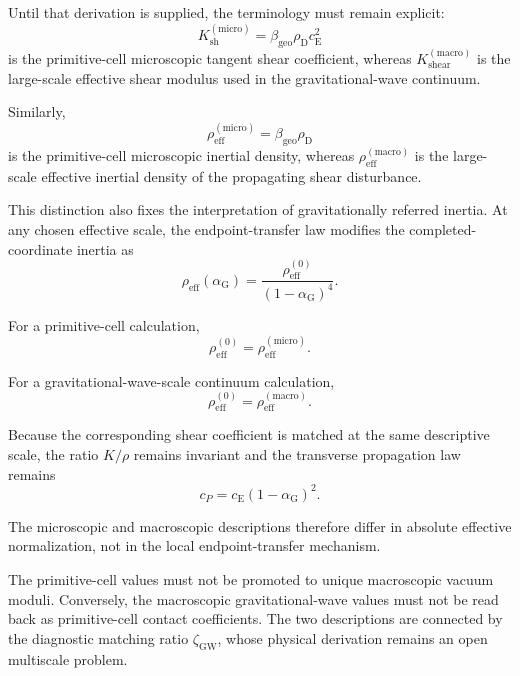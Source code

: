 Until that derivation is supplied, the terminology must remain explicit:
\begin{equation}
    K_{\mathrm{sh}}^{(\mathrm{micro})} = \beta_{\mathrm{geo}}\rho_{\mathrm{D}}c_{\mathrm{E}}^2
\end{equation}
is the primitive-cell microscopic tangent shear coefficient, whereas $K_{\mathrm{shear}}^{(\mathrm{macro})}$ is the large-scale effective shear modulus used in the gravitational-wave continuum.

Similarly,
\begin{equation}
    \rho_{\mathrm{eff}}^{(\mathrm{micro})} = \beta_{\mathrm{geo}}\rho_{\mathrm{D}}
\end{equation}
is the primitive-cell microscopic inertial density, whereas $\rho_{\mathrm{eff}}^{(\mathrm{macro})}$ is the large-scale effective inertial density of the propagating shear disturbance.

This distinction also fixes the interpretation of gravitationally referred inertia. At any chosen effective scale, the endpoint-transfer law modifies the completed-coordinate inertia as
\begin{equation}
    \rho_{\mathrm{eff}}(\alpha_{\mathrm{G}}) = \frac{ \rho_{\mathrm{eff}}^{(0)} }{ (1-\alpha_{\mathrm{G}})^4 }.
\end{equation}

For a primitive-cell calculation,
\begin{equation}
    \rho_{\mathrm{eff}}^{(0)} = \rho_{\mathrm{eff}}^{(\mathrm{micro})}.
\end{equation}

For a gravitational-wave-scale continuum calculation,
\begin{equation}
    \rho_{\mathrm{eff}}^{(0)} = \rho_{\mathrm{eff}}^{(\mathrm{macro})}.
\end{equation}

Because the corresponding shear coefficient is matched at the same descriptive scale, the ratio $K/\rho$ remains invariant and the transverse propagation law remains
\begin{equation}
    c_P = c_{\mathrm{E}} (1-\alpha_{\mathrm{G}})^2.
\end{equation}

The microscopic and macroscopic descriptions therefore differ in absolute effective normalization, not in the local endpoint-transfer mechanism.

The primitive-cell values must not be promoted to unique macroscopic vacuum moduli. Conversely, the macroscopic gravitational-wave values must not be read back as primitive-cell contact coefficients. The two descriptions are connected by the diagnostic matching ratio $\zeta_{\mathrm{GW}}$, whose physical derivation remains an open multiscale problem.

